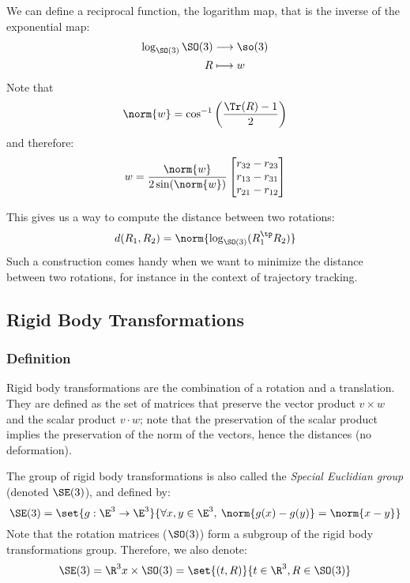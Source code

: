 We can define a reciprocal function, the logarithm map, that is the inverse of the exponential map:
\begin{equation*}
    \begin{aligned}
        \log_{\SO(3)}\SO(3)&\longrightarrow \so(3)\\
        R&\longmapsto w
    \end{aligned}
\end{equation*}
Note that
\begin{equation*}
    \norm{w}=\cos^{-1}\left(\frac{\Tr(R)-1}{2}\right)
\end{equation*}
and therefore:
\begin{equation*}
    w=\frac{\norm{w}}{2\sin(\norm{w})}\begin{bmatrix}
        r_{32}-r_{23} \\
        r_{13}-r_{31} \\
        r_{21}-r_{12}
    \end{bmatrix}
\end{equation*}

This gives us a way to compute the distance between two rotations:
\begin{equation*}
    d(R_1, R_2) = \norm{\log_{\SO(3)}(R_1^\tp R_2)}
\end{equation*}
Such a construction comes handy when we want to minimize the distance between two rotations, for instance in the context of trajectory tracking.

\subsection{Rigid Body Transformations}
\subsubsection{Definition}
Rigid body transformations are the combination of a rotation and a translation. They are defined as the set of matrices that preserve the vector product $v\times w$ and the scalar product $v\cdot w$; note that the preservation of the scalar product implies the preservation of the norm of the vectors, hence the distances (no deformation).

The group of rigid body transformations is also called the \emph{Special Euclidian group} (denoted $\SE(3)$), and defined by:
\begin{equation*}
    \SE(3) = \set{g:\E^3\to\E^3}{\forall x, y\in\E^3, \: \norm{g(x)-g(y)}=\norm{x-y}}
\end{equation*}
Note that the rotation matrices ($\SO(3)$) form a subgroup of the rigid body transformations group. Therefore, we also denote:
\begin{equation*}
    \SE(3) = \R^3x\times\SO(3) = \set{(t, R)}{t\in\R^3, R\in\SO(3)}
\end{equation*}

